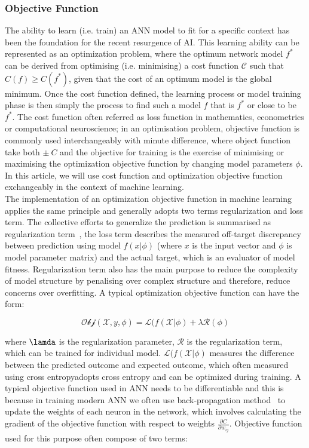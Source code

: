 \subsubsection{Objective Function}
The ability to learn (i.e. train) an ANN model to fit for a specific context has been the foundation for the recent resurgence of AI. This learning ability can be represented as an optimization problem, where the optimum network model $f^*$ can be derived from optimising (i.e. minimising) a cost function $\mathcal{C}$ such that $C(f) \geq C(f^*)$, given that the cost of an optimum model is the global minimum. Once the cost function defined, the learning process or model training phase is then simply the process to find such a model $f$ that is $f^*$ or close to be $f^*$. The cost function often referred as loss function in mathematics, econometrics or computational neuroscience; in an optimisation problem, objective function is commonly used interchangeably with minute difference, where object function take both $\pm~C$ and the objective for training is the exercise of minimising or maximising the optimization objective function by changing model parameters $\phi$. In this article, we will use cost function and optimization objective function exchangeably in the context of machine learning.
\\
The implementation of an optimization objective function in machine learning applies the same principle and generally adopts two terms regularization and loss term. The collective efforts to generalize the prediction is summarised as regularization term~\cite{goodfellow_2015}, the loss term describes the measured off-target discrepancy between prediction using model $f(x|\phi)$ (where $x$ is the input vector and $\phi$ is model parameter matrix) and the actual target, which is an evaluator of model fitness. Regularization term also has the main purpose to reduce the complexity of model structure by penalising over complex structure and therefore, reduce concerns over overfitting. A typical optimization objective function can have the form:

\begin{equation}
    \mathcal{Obj}(\mathcal{X},y,\phi) = \mathcal{L}(f(\mathcal{X}|\phi) + \lambda \mathcal{R} (\phi) 
\end{equation}

where $\lamda$ is the regularization parameter, $\mathcal{R}$ is the regularization term, which can be trained for individual model. $\mathcal{L}(f(\mathcal{X}|\phi)$ measures the difference between the predicted outcome and expected outcome, which often measured using cross entropyadopts cross entropy and can be optimized during training. A typical objective function used in ANN needs to be differentiable and this is because in training modern ANN we often use back-propagation method~\cite{LeCun_2015,Heaton_2017} to update the weights of each neuron in the network, which involves calculating the gradient of the objective function with respect to weights $\frac {\partial{C}} {\partial{w_{ij}}} $. Objective function used for this purpose often compose of two terms: 